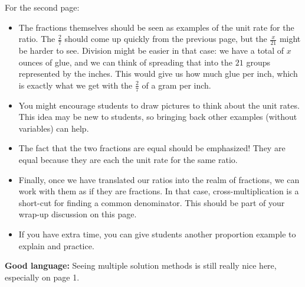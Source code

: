 \documentclass[nooutcomes,noauthor]{ximera}
\begin{document}
\begin{instructorNotes}
For the second page:
\begin{itemize}
	\item The fractions themselves should be seen as examples of the unit rate for the ratio. The $\frac{2}{7}$ should come up quickly from the previous page, but the $\frac{x}{21}$ might be harder to see. Division might be easier in that case: we have a total of $x$ ounces of glue, and we can think of spreading that into the $21$ groups represented by the inches. This would give us how much glue per inch, which is exactly what we get with the $\frac{2}{7}$ of a gram per inch.
	\item You might encourage students to draw pictures to think about the unit rates. This idea may be new to students, so bringing back other examples (without variables) can help.
	\item The fact that the two fractions are equal should be emphasized! They are equal because they are each the unit rate for the same ratio.
	\item Finally, once we have translated our ratios into the realm of fractions, we can work with them as if they are fractions. In that case, cross-multiplication is a short-cut for finding a common denominator. This should be part of your wrap-up discussion on this page.
	\item If you have extra time, you can give students another proportion example to explain and practice.
\end{itemize}




{\bf Good language:} Seeing multiple solution methods is still really nice here, especially on page 1.






\end{instructorNotes}
\end{document}
